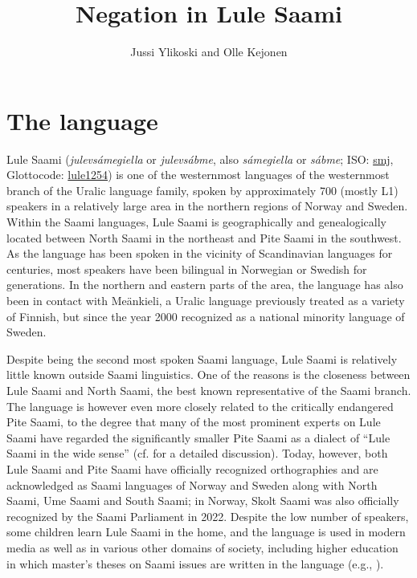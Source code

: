 \documentclass[output=paper,colorlinks,citecolor=brown]{langscibook}
\author{Jussi Ylikoski\affiliation{University of Turku, Sámi University of Applied Sciences} and Olle Kejonen\affiliation{Uppsala University}}
\title{Negation in Lule Saami}
\begin{document}
\maketitle 

\section{The language} \label{sec:lul:1}
Lule Saami (\textit{julevsámegiella} or \textit{julevsábme}, also \textit{sámegiella} or \textit{sábme}; ISO: \href{https://iso639-3.sil.org/code/smj}{smj}, Glottocode: \href{https://glottolog.org/resource/languoid/id/lule1254}{lule1254}) is one of the westernmost languages of the westernmost branch of the Uralic language family, spoken by approximately 700 (mostly L1) speakers in a relatively large area in the northern regions of Norway and Sweden. Within the Saami languages, Lule Saami is geographically and genealogically located between North Saami in the northeast and Pite Saami in the southwest. As the language has been spoken in the vicinity of Scandinavian languages for centuries, most speakers have been bilingual in Norwegian or Swedish for generations. In the northern and eastern parts of the area, the language has also been in contact with Meänkieli, a Uralic language previously treated as a variety of Finnish, but since the year 2000 recognized as a national minority language of Sweden.

Despite being the second most spoken Saami language, Lule Saami is relatively little known outside Saami linguistics. One of the reasons is the closeness between Lule Saami and North Saami, the best known representative of the Saami branch. The language is however even more closely related to the critically endangered Pite Saami, to the degree that many of the most prominent experts on Lule Saami have regarded the significantly smaller Pite Saami as a dialect of “Lule Saami in the wide sense” (cf. \citealt[41–43ff.]{Rydving2013} for a detailed discussion). Today, however, both Lule Saami and Pite Saami have officially recognized orthographies and are acknowledged as Saami languages of Norway and Sweden along with North Saami, Ume Saami and South Saami; in Norway, Skolt Saami was also officially recognized by the Saami Parliament in 2022. Despite the low number of speakers, some children learn Lule Saami in the home, and the language is used in modern media as well as in various other domains of society, including higher education in which master’s theses on Saami issues are written in the language (e.g., \citealt{Mikkelsen2011}).
\end{document}
